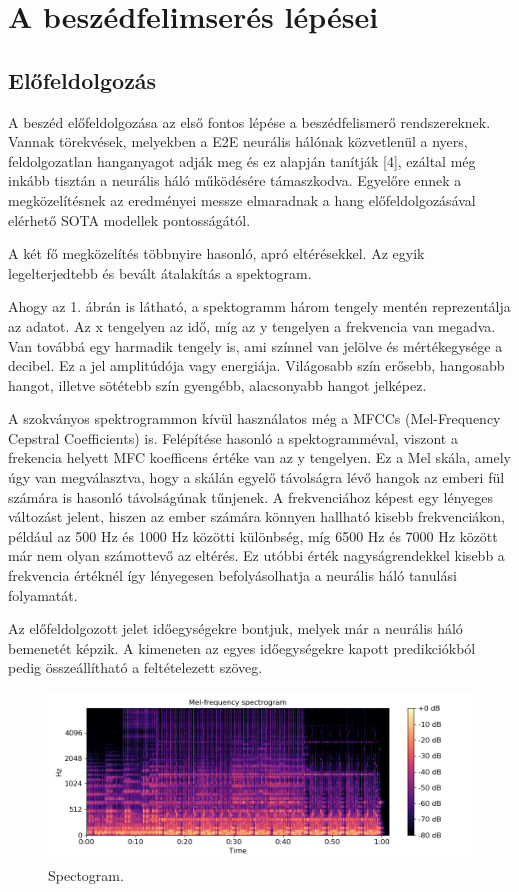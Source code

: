 \section{A beszédfelimserés lépései}

\subsection{Előfeldolgozás}

A beszéd előfeldolgozása az első fontos lépése a beszédfelismerő rendszereknek. Vannak törekvések, melyekben a E2E neurális hálónak közvetlenül a nyers, feldolgozatlan hanganyagot adják meg és ez alapján tanítják [4], ezáltal még inkább tisztán a neurális háló működésére támaszkodva. Egyelőre ennek a megközelítésnek az eredményei messze elmaradnak a hang előfeldolgozásával elérhető SOTA modellek pontosságától.

A két fő megközelítés többnyire hasonló, apró eltérésekkel. Az egyik legelterjedtebb és bevált átalakítás a spektogram.

Ahogy az 1. ábrán is látható, a spektogramm három tengely mentén reprezentálja az adatot. Az x tengelyen az idő, míg az y tengelyen a frekvencia van megadva. Van továbbá egy harmadik tengely is, ami színnel van jelölve és mértékegysége a decibel. Ez a jel amplitúdója vagy energiája. Világosabb szín erősebb, hangosabb hangot, illetve sötétebb szín gyengébb, alacsonyabb hangot jelképez.

A szokványos spektrogrammon kívül használatos még a MFCCs (Mel-Frequency Cepstral Coefficients) is. Felépítése hasonló a spektogramméval, viszont a frekencia helyett MFC koefficens értéke van az y tengelyen. Ez a Mel skála, amely úgy van megválasztva, hogy a skálán egyelő távolságra lévő hangok az emberi fül számára is hasonló távolságúnak tűnjenek. A frekvenciához képest egy lényeges változást jelent, hiszen az ember számára könnyen hallható kisebb frekvenciákon, például az 500 Hz és 1000 Hz közötti különbség, míg 6500 Hz és 7000 Hz között már nem olyan számottevő az eltérés. Ez utóbbi érték nagyságrendekkel kisebb a frekvencia értéknél így lényegesen befolyásolhatja a neurális háló tanulási folyamatát.

Az előfeldolgozott jelet időegységekre bontjuk, melyek már a neurális háló bemenetét képzik. A kimeneten az egyes időegységekre kapott predikciókból pedig összeállítható a feltételezett szöveg.

\begin{figure}[!ht]
\centering
\includegraphics[width=150mm, keepaspectratio]{figures/spectogram.png}
\caption{Spectogram.}
\label{fig:TeXstudio}
\end{figure}


